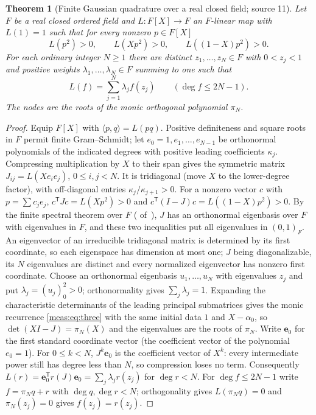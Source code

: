 \documentclass[11pt]{article}
\numberwithin{equation}{section}
\newtheorem{theorem}{Theorem}[section]
\theoremstyle{definition}
\theoremstyle{remark}
\newcommand{\inner}[2]{\langle#1,#2\rangle}
\begin{document}
\begin{theorem}[Finite Gaussian quadrature over a real closed field;
source 11]\label{meas:thm:gauss}
Let $F$ be a real closed ordered field and $L:F[X]\to F$ an $F$-linear map with
$L(1)=1$ such that for every nonzero $p\in F[X]$
\begin{equation}\label{meas:eq:gausshyp}
 L(p^2)>0,\qquad L(Xp^2)>0,\qquad L((1-X)p^2)>0.
\end{equation}
For each ordinary integer $N\ge1$ there are distinct $z_1,\ldots,z_N\in F$ with
$0<z_j<1$ and positive weights $\lambda_1,\ldots,\lambda_N\in F$ summing to one
such that
\begin{equation}\label{meas:eq:gauss}
 L(f)=\sum_{j=1}^N\lambda_jf(z_j)\qquad(\deg f\le2N-1).
\end{equation}
The nodes are the roots of the monic orthogonal polynomial $\pi_N$.
\end{theorem}
\begin{proof}
Equip $F[X]$ with $\inner pq=L(pq)$. Positive definiteness and square roots in $F$
permit finite Gram--Schmidt; let $e_0=1,e_1,\ldots,e_{N-1}$ be orthonormal
polynomials of the indicated degrees with positive leading coefficients
$\kappa_j$. Compressing multiplication by $X$ to their span gives the symmetric
matrix $J_{ij}=L(Xe_ie_j)$, $0\le i,j<N$. It is tridiagonal (move $X$ to the
lower-degree factor), with off-diagonal entries $\kappa_j/\kappa_{j+1}>0$. For a
nonzero vector $c$ with $p=\sum c_je_j$,
$c^{\mathsf T}Jc=L(Xp^2)>0$ and $c^{\mathsf T}(I-J)c=L((1-X)p^2)>0$. By the finite
spectral theorem over $F$ ( of~\cite{repospec}), $J$ has an
orthonormal eigenbasis over $F$ with eigenvalues in $F$, and these two
inequalities put all eigenvalues in $(0,1)_F$. An eigenvector of an irreducible tridiagonal matrix
is determined by its first coordinate, so each eigenspace has dimension at most
one; $J$ being diagonalizable, its $N$ eigenvalues are distinct and every
normalized eigenvector has nonzero first coordinate. Choose an orthonormal
eigenbasis $u_1,\ldots,u_N$ with eigenvalues $z_j$ and put $\lambda_j=(u_j)_0^2>0$;
orthonormality gives $\sum_j\lambda_j=1$. Expanding the characteristic
determinants of the leading principal submatrices gives the monic recurrence
\eqref{meas:eq:three} with the same initial data $1$ and $X-\alpha_0$, so
$\det(XI-J)=\pi_N(X)$ and the eigenvalues are the roots of $\pi_N$. Write $\mathbf e_0$ for the first standard coordinate vector (the
coefficient vector of the polynomial $e_0=1$). For $0\le k<N$,
$J^k\mathbf e_0$ is the coefficient vector of $X^k$: every intermediate
power still has degree less than $N$, so compression loses no term.
Consequently $L(r)=\mathbf e_0^{\mathsf T}r(J)\mathbf e_0
=\sum_j\lambda_jr(z_j)$ for $\deg r<N$. For $\deg f\le2N-1$ write $f=\pi_Nq+r$ with $\deg
q,\deg r<N$; orthogonality gives $L(\pi_Nq)=0$ and $\pi_N(z_j)=0$ gives
$f(z_j)=r(z_j)$.
\end{proof}
\end{document}
